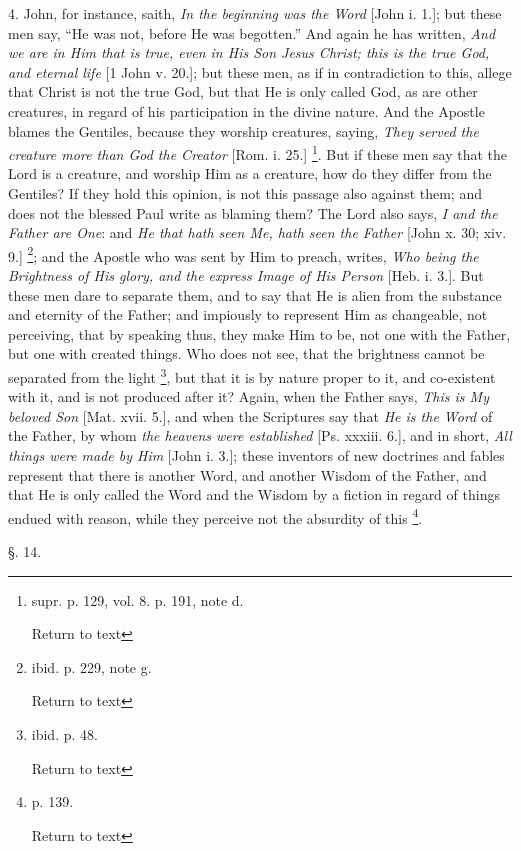 4. John, for instance, saith, \emph{In the beginning
was the Word} [John i. 1.]; but these men say, ``He was not, before
He was begotten.'' And again he has written, \emph{And we are in Him that
is true, even in His Son Jesus Christ; this is the true God, and
eternal life} [1 John v. 20.]; but these men, as if in
contradiction to this, allege that Christ is not the true God, but
that He is only called God, as are other creatures, in regard of his
participation in the divine nature. And the Apostle blames the
Gentiles, because they worship creatures, saying, \emph{They served the
creature more than God the Creator} [Rom. i. 25.] \footnote{supr. p. 129, vol. 8. p. 191, note d.

Return to text}. But if these men say that the Lord is a creature, and worship Him
as a creature, how do they differ from the Gentiles? If they hold this
opinion, is not this passage also against them; and does not the
blessed Paul write as blaming them? The Lord also says, \emph{I and the
Father are One}: and \emph{He that hath seen Me, hath seen the Father}
[John x. 30; xiv. 9.] \footnote{ibid. p. 229, note g.

Return to text}; and the
Apostle who was sent by Him to preach, writes, \emph{Who being the
Brightness of His glory, and the express Image of His Person} [Heb.
i. 3.]. But these men dare to separate them, and to say that He is
alien from the substance and eternity of the Father; and impiously to
represent Him as changeable, not perceiving, that by speaking thus,
they make Him to be, not one with the Father, but one with created
things. Who does not see, that the brightness cannot be separated from
the light \footnote{ibid. p. 48.

Return to text}, but that it is by nature
proper to it, and co-existent with it, and is not produced after
it? Again, when the Father says, \emph{This is My beloved Son} [Mat.
xvii. 5.], and when the Scriptures say that \emph{He is the Word} of
the Father, by whom \emph{the heavens were established} [Ps. xxxiii.
6.], and in short, \emph{All things were made by Him} [John i. 3.];
these inventors of new doctrines and fables represent that there is
another Word, and another Wisdom of the Father, and that He is only
called the Word and the Wisdom by a fiction in regard of things endued
with reason, while they perceive not the absurdity of this \footnote{p. 139.

Return to text}.

§. 14.

